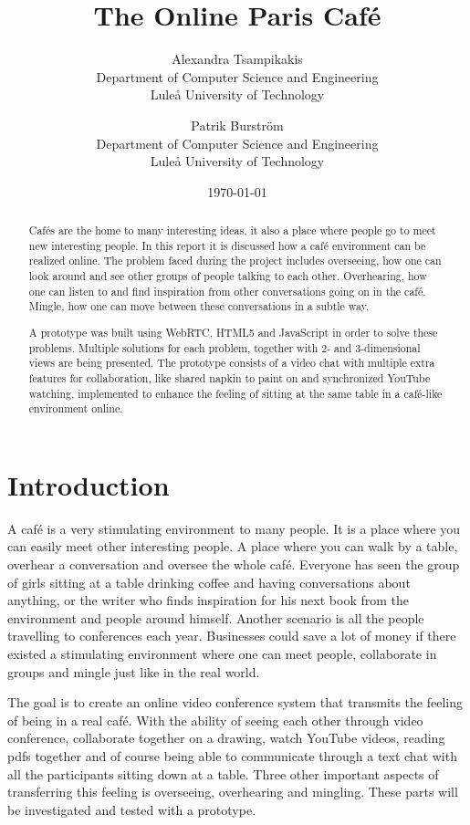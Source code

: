 \documentclass[12pt, titlepage]{article}
\title{The Online Paris Café}
\author{
        Alexandra Tsampikakis \\
                Department of Computer Science and Engineering\\
        Luleå University of Technology\\
            \and
        Patrik Burström\\
                Department of Computer Science and Engineering\\
        Luleå University of Technology\\
}
\date{\today}
\begin{document}
\newpage
\begin{abstract}
Cafés are the home to many interesting ideas, it also a place where people go to meet new interesting people. In this report it is discussed how a café environment can be realized online. The problem faced during the project includes overseeing, how one can look around and see other groups of people talking to each other. Overhearing, how one can listen to and find inspiration from other conversations going on in the café. Mingle, how one can move between these conversations in a subtle way.

A prototype was built using WebRTC, HTML5 and JavaScript in order to solve these problems. Multiple solutions for each problem, together with 2- and 3-dimensional views are being presented. The prototype consists of a video chat with multiple extra features for collaboration, like shared napkin to paint on and  synchronized YouTube watching, implemented to enhance the feeling of sitting at the same table in a café-like environment online. 
\end{abstract}
\tableofcontents
\clearpage
\section{Introduction}
A café is a very stimulating environment to many people. It is a place where you can easily meet other interesting people. A place where you can walk by a table, overhear a conversation and oversee the whole café. Everyone has seen the group of girls sitting at a table drinking coffee and having conversations about anything, or the writer who finds inspiration for his next book from the environment and people around himself. Another scenario is all the people travelling to conferences each year. Businesses could save a lot of money if there existed a stimulating environment where one can meet people, collaborate in groups and mingle just like in the real world.

The goal is to create an online video conference system that transmits the feeling of being in a real café. With the ability of seeing each other through video conference, collaborate together on a drawing, watch YouTube videos, reading pdfs together and of course being able to communicate through a text chat with all the participants sitting down at a table. Three other important aspects of transferring this feeling is overseeing, overhearing and mingling. These parts will be investigated and tested with a prototype.
\end{document}

